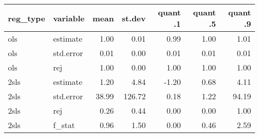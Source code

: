 \begin{tabular}{llrrrrr}
  \hline
reg\_type & variable & mean & st.dev & quant .1 & quant .5 & quant .9 \\ 
  \hline
ols & estimate & 1.00 & 0.01 & 0.99 & 1.00 & 1.01 \\ 
  ols & std.error & 0.01 & 0.00 & 0.01 & 0.01 & 0.01 \\ 
  ols & rej & 1.00 & 0.00 & 1.00 & 1.00 & 1.00 \\ 
  2sls & estimate & 1.20 & 4.84 & -1.20 & 0.68 & 4.11 \\ 
  2sls & std.error & 38.99 & 126.72 & 0.18 & 1.22 & 94.19 \\ 
  2sls & rej & 0.26 & 0.44 & 0.00 & 0.00 & 1.00 \\ 
  2sls & f\_stat & 0.96 & 1.50 & 0.00 & 0.46 & 2.59 \\ 
   \hline
\end{tabular}

